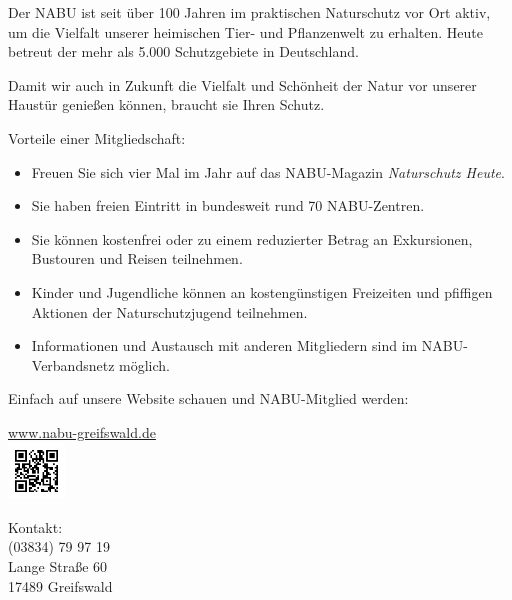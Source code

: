 \newpage
{}
Der NABU ist seit über 100 Jahren im praktischen Naturschutz vor Ort aktiv, um die Vielfalt unserer heimischen Tier- und Pflanzenwelt zu erhalten. Heute betreut der  mehr als 5.000 Schutzgebiete in Deutschland.

Damit wir auch in Zukunft die Vielfalt und Schönheit der Natur vor unserer Haustür genießen können, braucht sie Ihren Schutz. 

Vorteile einer Mitgliedschaft:
\begin{itemize}
  \item Freuen Sie sich vier Mal im Jahr auf das NABU-Magazin \textit{Naturschutz Heute}.
  \item Sie haben freien Eintritt in bundesweit rund 70 NABU-Zentren.
  \item Sie können kostenfrei oder zu einem reduzierter Betrag an Exkursionen, Bustouren und Reisen teilnehmen.
  \item Kinder und Jugendliche können an kostengünstigen Freizeiten und pfiffigen Aktionen der Naturschutzjugend teilnehmen.
  \item Informationen und Austausch mit anderen Mitgliedern sind im NABU-Verbandsnetz möglich.
\end{itemize}
Einfach auf unsere Website schauen und  NABU-Mitglied werden:\\
\begin{center}
\url{www.nabu-greifswald.de}\\
\includegraphics[width=1.5cm]{logos/hp-qrcode}
\end{center}
Kontakt:\\
(03834) 79 97 19\\
Lange Straße 60\\
17489 Greifswald

